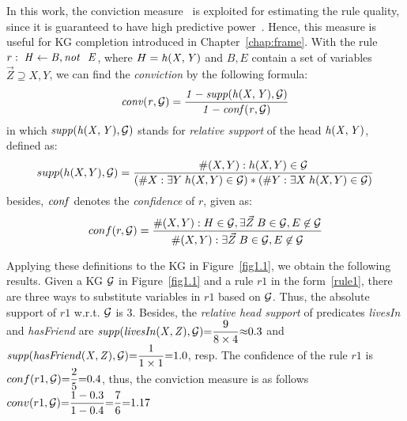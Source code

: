 In this work, the conviction measure~\cite{ref48} is exploited for estimating the rule quality, since it is guaranteed to have high predictive power~\cite{ref46}. Hence, this measure is useful for KG completion introduced in Chapter~\ref{chap:frame}. With the rule $r:\;\mi{H\leftarrow B, \naf\ E}$, where $H=\mathit{h(X,Y)}$ and $B,E$ contain a set of variables $\vec{Z}\supseteq X,Y$, we can find the \emph{conviction} by the following formula:
\vspace{-.26cm}
\begin{equation}
\mathit{conv(r, \mathcal{G})= \dfrac{1 - supp(h(X,Y), \mathcal{G})}{1 - conf(r, \mathcal{G})}}
\end{equation}
in which $\mathit{supp(h(X,Y),\mathcal{G})}$ stands for \textit{relative support} of the head $\mathit{h(X,Y)}$, defined as:
\vspace{-.28cm}
\begin{equation}
supp(h(X,Y),\mathcal{G})=\dfrac{\#(X,Y):h(X,Y)\in \mathcal{G}}{(\#X:\exists Y\;h(X,Y)\in \mathcal{G})*(\#Y:\exists X\;h(X,Y)\in \mathcal{G})}
\end{equation}
besides, $\mathit{conf}$ denotes the \textit{confidence} of $r$, given as:
\begin{equation}
conf(r,\mathcal{G})=\dfrac{\#(X,Y): H \in \mathcal{G}, \exists \vec{Z}\;B\in \mathcal{G},E \not \in \mathcal{G}}{\#(X,Y):\exists \vec{Z}\; B\in \mathcal{G}, E \not \in \mathcal{G}}
\end{equation}
\vspace{-.3cm}

\begin{example}
Applying these definitions to the KG in Figure~\ref{fig1.1}, we obtain the following results. Given a KG $\mathcal{G}$ in Figure~\ref{fig1.1} and a rule $r1$ in the form~\ref{rule1}, there are three ways to substitute variables in $r1$ based on $\mathcal{G}$. Thus, the absolute support of $r1$ w.r.t. $\mathcal{G}$ is $3$. Besides, the \textit{relative head support} of predicates \textit{livesIn} and \textit{hasFriend} are $\mathit{supp(livesIn(X,Z), \mathcal{G})}{=}\dfrac{9}{8 \times 4}{\approx} 0.3$ and  $\mathit{supp(hasFriend(X,Z), \mathcal{G})}{=}\dfrac{1}{1 \times 1}{=} 1.0$, resp. The confidence of the rule $r1$ is $conf(r1, \mathcal{G}) {=} \dfrac{2}{5} {=} 0.4$, thus, the conviction measure is as follows $conv(r1, \mathcal{G}) {=} \dfrac{1-0.3}{1 - 0.4} {=} \dfrac{7}{6} {=} 1.17$
\end{example}